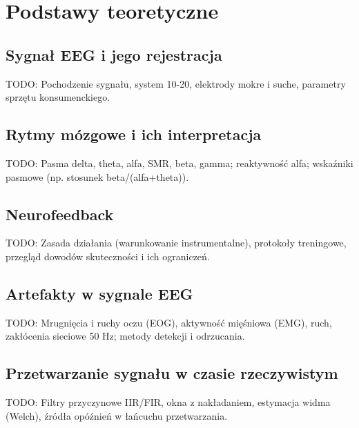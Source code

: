 \chapter{Podstawy teoretyczne}
\label{chapt:Podstawy}

\section{Sygnał EEG i jego rejestracja}
TODO: Pochodzenie sygnału, system 10-20, elektrody mokre i suche, parametry sprzętu konsumenckiego.

\section{Rytmy mózgowe i ich interpretacja}
TODO: Pasma delta, theta, alfa, SMR, beta, gamma; reaktywność alfa; wskaźniki pasmowe (np. stosunek beta/(alfa+theta)).

\section{Neurofeedback}
TODO: Zasada działania (warunkowanie instrumentalne), protokoły treningowe, przegląd dowodów skuteczności i ich ograniczeń.

\section{Artefakty w sygnale EEG}
TODO: Mrugnięcia i ruchy oczu (EOG), aktywność mięśniowa (EMG), ruch, zakłócenia sieciowe 50 Hz; metody detekcji i odrzucania.

\section{Przetwarzanie sygnału w czasie rzeczywistym}
TODO: Filtry przyczynowe IIR/FIR, okna z nakładaniem, estymacja widma (Welch), źródła opóźnień w łańcuchu przetwarzania.
